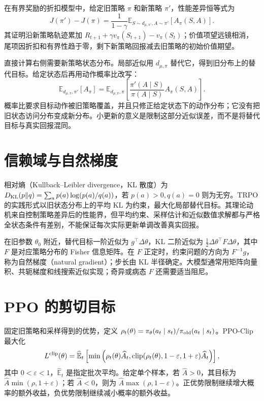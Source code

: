 \documentclass[UTF8,12pt,a4paper,fontset=fandol]{ctexbook}
\begin{document}
在有界奖励的折扣模型中，给定旧策略 $\pi$ 和新策略 $\pi'$，性能差异恒等式为
\begin{equation}
J(\pi')-J(\pi)=\frac1{1-\gamma}
\mathbb E_{S\sim d_{\mu,\pi'},A\sim\pi'}[A_\pi(S,A)].
\label{eq:rl-performance-difference}
\end{equation}
其证明沿新策略轨迹累加 $R_{t+1}+\gamma v_\pi(S_{t+1})-v_\pi(S_t)$；价值项望远镜相消，尾项因折扣和有界性趋于零，剩下新策略回报减去旧策略的初始价值期望。

直接计算右侧需要新策略状态分布。局部近似用 $d_{\mu,\pi}$ 替代它，得到旧分布上的替代目标。给定状态后再用动作概率比改写：
\[
\mathbb E_{d_{\mu,\pi},\pi'}[A_\pi]
=\mathbb E_{d_{\mu,\pi},\pi}\left[\frac{\pi'(A\mid S)}{\pi(A\mid S)}A_\pi(S,A)\right].
\]
概率比要求目标动作被旧策略覆盖，并且只修正给定状态下的动作分布；它没有把旧状态访问分布变成新分布。小更新的意义是限制这部分近似误差，而不是将替代目标与真实回报混同。

\section{信赖域与自然梯度}

相对熵（Kullback--Leibler divergence，KL 散度）为 $D_{\rm KL}(p\|q)=\sum_a p(a)\log(p(a)/q(a))$，若 $p(a)>0,q(a)=0$ 则为无穷。TRPO 的实践形式以旧状态分布上的平均 KL 为约束，最大化局部替代目标。其理论动机来自控制策略差异后的性能界，但平均约束、采样估计和近似数值求解都与严格全状态条件有差别，不能保证每次实际更新单调改善真实回报。

在旧参数 $\theta_0$ 附近，替代目标一阶近似为 $g^\top\Delta\theta$，KL 二阶近似为 $\tfrac12\Delta\theta^\top F\Delta\theta$，其中 $F$ 是对应策略分布的 Fisher 信息矩阵。在 $F$ 正定时，约束问题的方向为 $F^{-1}g$，称为自然梯度（natural gradient）；步长由 KL 半径确定。大模型通常用矩阵向量积、共轭梯度和线搜索近似实现；奇异或病态 $F$ 还需要适当阻尼。

\section{PPO 的剪切目标}

固定旧策略和采样得到的优势，定义 $\rho_t(\theta)=\pi_\theta(a_t\mid s_t)/\pi_{\rm old}(a_t\mid s_t)$。PPO-Clip 最大化
\begin{equation}
L^{\rm clip}(\theta)=\widehat{\mathbb E}_t
\left[\min\left(\rho_t(\theta)\widehat A_t,
\operatorname{clip}(\rho_t(\theta),1-\varepsilon,1+\varepsilon)\widehat A_t\right)\right],
\label{eq:rl-ppo-clipping}
\end{equation}
其中 $0<\varepsilon<1$，$\widehat{\mathbb E}_t$ 是指定批次平均。给定单个样本，若 $\widehat A>0$，其目标为 $\widehat A\min(\rho,1+\varepsilon)$；若 $\widehat A<0$，则为 $\widehat A\max(\rho,1-\varepsilon)$。正优势限制继续增大概率的额外收益，负优势限制继续减小概率的额外收益。
\end{document}
